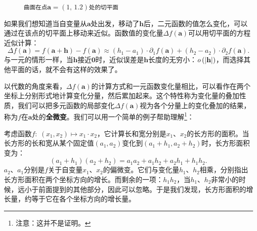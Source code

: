 \documentclass[12pt,UTF8,fontset=none]{ctexbook}
\begin{document}
\begin{figure}[h]
    \caption*{\texttt{曲面在点}$\mathbf{a}=(1,\,1.2)$\texttt{处的切平面}}
\end{figure}

如果我们想知道当自变量从$\mathbf{a}$处出发，移动了$\mathbf{h}$后，二元函数的值怎么变化，可以通过在该点的切平面上移动来近似。函数值的变化量$\Delta f(\mathbf{a})$可以用切平面的方程近似计算：
$$ \Delta f(\mathbf{a}) = f(\mathbf{a}+ \mathbf{h}) - f(\mathbf{a}) \approx (h_1 - a_1)\cdot\partial_1 f(\mathbf{a}) + (h_2 - a_2)\cdot\partial_2 f(\mathbf{a}). $$
与一元的情形一样，当$\mathbf{h}$接近$\mathbf{0}$时，近似误差是$\mathbf{h}$长度的无穷小：$\mathit{o}\left(|\mathbf{h}|\right)$，而选择其他平面的话，就不会有这样的效果了。

以代数的角度来看，$\Delta f(\mathbf{a})$的计算方式和一元函数变化量相比，可以看作在两个坐标上分别形式地计算变化分量，然后累加起来。这个特性称为变化量的叠加性质，我们可以把多元函数的局部变化$\Delta f(\mathbf{a})$视为各个分量上的变化叠加的结果，称为$f$在$\mathbf{a}$处的\textbf{全微变}。我们可以用一个简单的例子帮助理解\footnote{注意：这并不是证明。}：

考虑函数$f:\;(x_1, x_2) \mapsto x_1\cdot x_2$，它计算长和宽分别是$x_1$、$x_2$的长方形的面积。当长方形的长和宽从某个固定值$(a_1, a_2)$变化到$(a_1 + h_1, a_2 + h_2)$时，长方形面积变为：
$$(a_1 + h_1)(a_2 + h_2) = a_1a_2 + a_1 h_2 + a_2h_1 + h_1h_2.$$
$a_2$、$a_1$分别是$f$关于自变量$x_1$、$x_2$的偏微变。它们与变化量$h_1$、$h_2$相乘，分别指出长方形面积在两个坐标方向的增长。而剩余的一项：$h_1h_2$，当$h_1$、$h_2$非常小的时候，远小于前面提到的其他部分，因此可以忽略。于是我们发现，长方形面积的增长量，约等于它在各个坐标方向的增长量。
\end{document}
